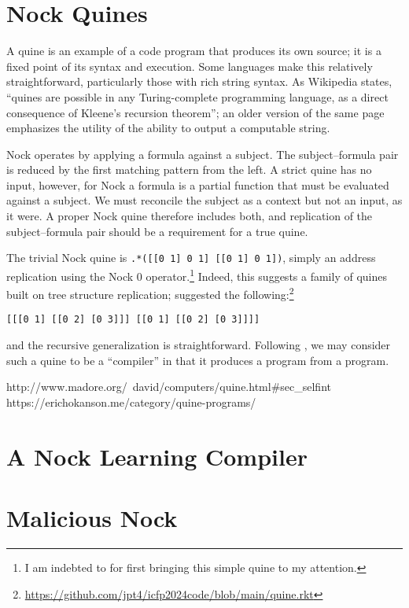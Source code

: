 \documentclass[twoside]{article}
\begin{document}
\section{Nock Quines}

A quine is an example of a code program that produces its own source; it is a fixed point of its syntax and execution.  Some languages make this relatively straightforward, particularly those with rich string syntax.  As Wikipedia states, “quines are possible in any Turing-complete programming language, as a direct consequence of Kleene's recursion theorem”; an older version of the same page emphasizes the utility of the ability to output a computable string.

Nock operates by applying a formula against a subject.  The subject–formula pair is reduced by the first matching pattern from the left.  A strict quine has no input, however, for Nock a formula is a partial function that must be evaluated against a subject.  We must reconcile the subject as a context but not an input, as it were.  A proper Nock quine therefore includes both, and replication of the subject–formula pair should be a requirement for a true quine.

The trivial Nock quine is \lstinline[style=inlinecode]{.*([[0 1] 0 1] [[0 1] 0 1])}, simply an address replication using the Nock 0 operator.\footnote{I am indebted to  for first bringing this simple quine to my attention.}  Indeed, this suggests a family of quines built on tree structure replication;  suggested the following:\footnote{\url{https://github.com/jpt4/icfp2024code/blob/main/quine.rkt}}

\begin{lstlisting}[style=listingcode]
[[[0 1] [[0 2] [0 3]]] [[0 1] [[0 2] [0 3]]]]
\end{lstlisting}

\noindent
and the recursive generalization is straightforward.  Following \citeauthor{Thompson1984}, we may consider such a quine to be a “compiler” in that it produces a program from a program.

http://www.madore.org/~david/computers/quine.html#sec_selfint
https://erichokanson.me/category/quine-programs/

\section{A Nock Learning Compiler}

\section{Malicious Nock}
\end{document}
